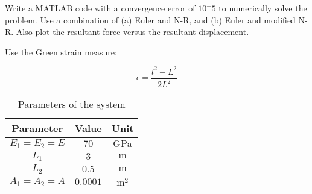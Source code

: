 \noindent Write a MATLAB code with a convergence error of $10^-5$ to numerically solve the problem.
Use a combination of (a) Euler and N-R, and (b) Euler and modified N-R.
Also plot the resultant force versus the resultant displacement.

\noindent Use the Green strain measure:

\begin{equation}
    \epsilon = \frac{l^2 - L^2}{2L^2}
\end{equation}

\begin{table}[H]
    \centering
    \begin{tabular}{|c|c|c|}
        \hline
        \textbf{Parameter} & \textbf{Value} & \textbf{Unit} \\ \hline
        $E_1 = E_2 = E$    & $70$           & $\text{GPa}$  \\ \hline
        $L_1$              & $3$            & $\text{m}$    \\ \hline
        $L_2$              & $0.5$          & $\text{m}$    \\ \hline
        $A_1 = A_2 = A$    & $0.0001$       & $\text{m}^2$  \\ \hline
    \end{tabular}
    \caption{Parameters of the system}
    \label{tab:parameters_of_the_system}
\end{table}
